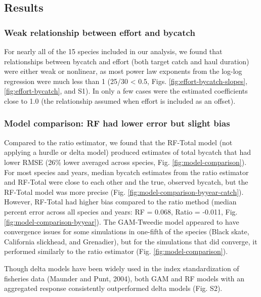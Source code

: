 \documentclass[]{article}
\begin{document}
\subsection{Results}\label{results}

\subsubsection{Weak relationship between effort and
bycatch}\label{weak-relationship-between-effort-and-bycatch}

For nearly all of the 15 species included in our analysis, we found that
relationships between bycatch and effort (both target catch and haul
duration) were either weak or nonlinear, as most power law exponents
from the log-log regression were much less than 1 (25/30 \textless{}
0.5, Figs. \ref{fig:effort-bycatch-slopes}, \ref{fig:effort-bycatch},
and S1). In only a few cases were the estimated coefficients close to
1.0 (the relationship assumed when effort is included as an offset).

\subsubsection{Model comparison: RF had lower error but slight
bias}\label{model-comparison-rf-had-lower-error-but-slight-bias}

Compared to the ratio estimator, we found that the RF-Total model (not
applying a hurdle or delta model) produced estimates of total bycatch
that had lower RMSE (26\% lower averaged across species, Fig.
\ref{fig:model-comparison}). For most species and years, median bycatch
estimates from the ratio estimator and RF-Total were close to each other
and the true, observed bycatch, but the RF-Total model was more precise
(Fig. \ref{fig:model-comparison-byyear-catch}). However, RF-Total had
higher bias compared to the ratio method (median percent error across
all species and years: RF = 0.068, Ratio = -0.011, Fig.
\ref{fig:model-comparison-byyear}). The GAM-Tweedie model appeared to
have convergence issues for some simulations in one-fifth of the species
(Black skate, California slickhead, and Grenadier), but for the
simulations that did converge, it performed similarly to the ratio
estimator (Fig. \ref{fig:model-comparison}).

Though delta models have been widely used in the index standardization
of fisheries data (Maunder and Punt, 2004), both GAM and RF models with
an aggregated response consistently outperformed delta models (Fig. S2).
\end{document}
